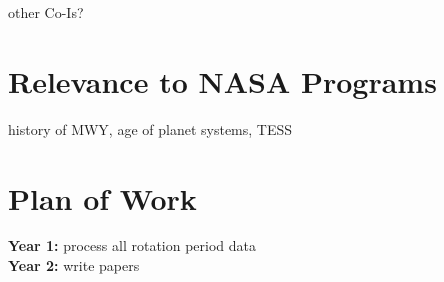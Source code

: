 \documentclass[12pt]{article}
\begin{document}
other Co-Is?

\section{Relevance to NASA Programs}
history of MWY, age of planet systems, TESS



\section{Plan of Work}
{\bf Year 1:} process all rotation period data
\\
{\bf Year 2:} write papers



\clearpage


\end{document}
